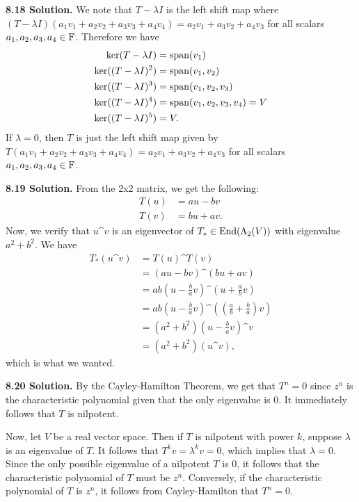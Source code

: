 \textbf{8.18 Solution.} We note that $T - \lambda I$ is the left shift map where $(T - \lambda I)(a_1v_1 + a_2v_2 + a_3v_3 + a_4v_4) = a_2v_1 + a_3v_2 + a_4v_3$ for all scalars $a_1, a_2, a_3, a_4 \in \mathbb{F}$. Therefore we have
\begin{align*}
    \text{ker}(T - \lambda I) &= \text{span}(v_1) \\
    \text{ker}((T - \lambda I)^2) &= \text{span}(v_1, v_2) \\
    \text{ker}((T - \lambda I)^3) &= \text{span}(v_1, v_2, v_3) \\
    \text{ker}((T - \lambda I)^4) &= \text{span}(v_1, v_2, v_3, v_4) = V \\
    \text{ker}((T - \lambda I)^5) &= V.
\end{align*}
If $\lambda = 0$, then $T$ is just the left shift map given by $T(a_1v_1 + a_2v_2 + a_3v_3 + a_4v_4) = a_2v_1 + a_3v_2 + a_4v_3$ for all scalars $a_1, a_2, a_3, a_4 \in \mathbb{F}$.

\textbf{8.19 Solution.} From the 2x2 matrix, we get the following:
\begin{align*}
    T(u) &= au - bv \\
    T(v) &= bu + av.
\end{align*}
Now, we verify that $u \^ v$ is an eigenvector of $T_* \in \text{End}(\Lambda_2(V))$ with eigenvalue $a^2 + b^2$. We have
\begin{align*}
    T_*(u \^ v) &= T(u) \^ T(v) \\
        &= (au - bv) \^ (bu + av) \\
        &= ab\left(u - \frac{b}{a}v\right) \^ \left(u + \frac{a}{b}v\right) \\
        &= ab\left(u - \frac{b}{a}v\right) \^ \left(\left(\frac{a}{b} + \frac{b}{a}\right)v\right) \\
        &= (a^2 + b^2)\left(u - \frac{b}{a}v\right) \^ v \\
        &= (a^2 + b^2)(u \^ v),
\end{align*}
which is what we wanted.

\textbf{8.20 Solution.} By the Cayley-Hamilton Theorem, we get that $T^n = 0$ since $z^n$ is the characteristic polynomial given that the only eigenvalue is 0. It immediately follows that $T$ is nilpotent.

Now, let $V$ be a real vector space. Then if $T$ is nilpotent with power $k$, suppose $\lambda$ is an eigenvalue of $T$. It follows that $T^kv = \lambda^kv = 0$, which implies that $\lambda = 0$. Since the only possible eigenvalue of a nilpotent $T$ is 0, it follows that the characteristic polynomial of $T$ must be $z^n$. Conversely, if the characteristic polynomial of $T$ is $z^n$, it follows from Cayley-Hamilton that $T^n = 0$.


